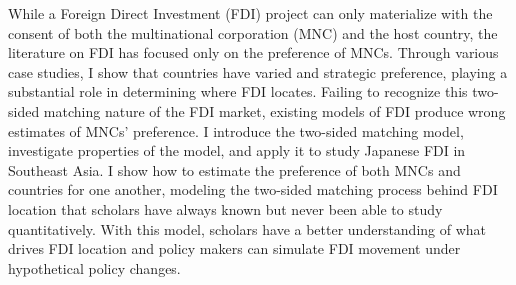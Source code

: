 \abstract

While a Foreign Direct Investment (FDI) project can only materialize with the consent of both the multinational corporation (MNC) and the host country, the literature on FDI has focused only on the preference of MNCs. Through various case studies, I show that countries have varied and strategic preference, playing a substantial role in determining where FDI locates. Failing to recognize this two-sided matching nature of the FDI market, existing models of FDI produce wrong estimates of MNCs' preference. I introduce the two-sided matching model, investigate properties of the model, and apply it to study Japanese FDI in Southeast Asia. I show how to estimate the preference of both MNCs and countries for one another, modeling the two-sided matching process behind FDI location that scholars have always known but never been able to study quantitatively. With this model, scholars have a better understanding of what drives FDI location and policy makers can simulate FDI movement under hypothetical policy changes.